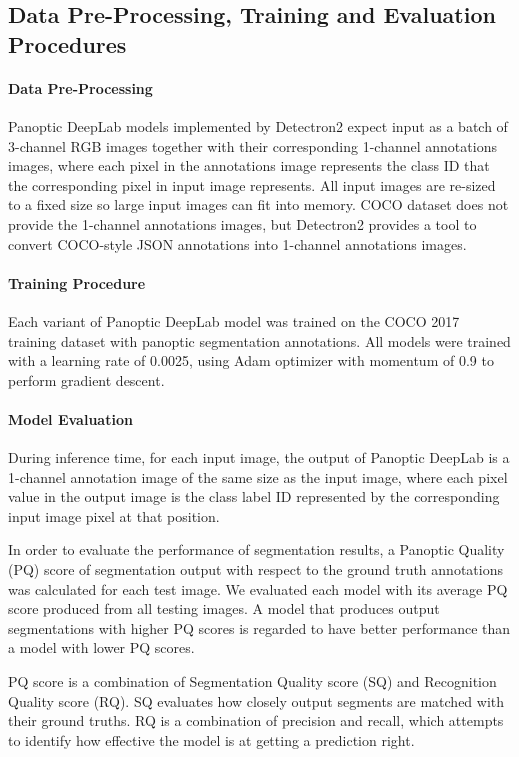 \documentclass[10pt,twocolumn,letterpaper]{article}
\begin{document}
\subsection{Data Pre-Processing, Training and Evaluation Procedures} 

\paragraph{Data Pre-Processing} Panoptic DeepLab models implemented by Detectron2 expect input as a batch of 3-channel RGB images together with their corresponding 1-channel annotations images, where each pixel in the annotations image represents the class ID that the corresponding pixel in input image represents. All input images are re-sized to a fixed size so large input images can fit into memory. COCO dataset does not provide the 1-channel annotations images, but Detectron2 provides a tool to convert COCO-style JSON annotations into 1-channel annotations images.

\paragraph{Training Procedure} Each variant of Panoptic DeepLab model was trained on the COCO 2017 training dataset with panoptic segmentation annotations. All models were trained with a learning rate of 0.0025, using Adam optimizer with momentum of 0.9 to perform gradient descent.

\paragraph{Model Evaluation}
During inference time, for each input image, the output of Panoptic DeepLab is a 1-channel annotation image of the same size as the input image, where each pixel value in the output image is the class label ID represented by the corresponding input image pixel at that position.

In order to evaluate the performance of segmentation results, a Panoptic Quality (PQ) score of segmentation output with respect to the ground truth annotations was calculated for each test image. We evaluated each model with its average PQ score produced from all testing images. A model that produces output segmentations with higher PQ scores is regarded to have better performance than a model with lower PQ scores.

PQ score is a combination of Segmentation Quality score (SQ) and Recognition Quality score (RQ). SQ evaluates how closely output segments are matched with their ground truths. RQ is a combination of precision and recall, which attempts to identify how effective the model is at getting a prediction right.
\end{document}
